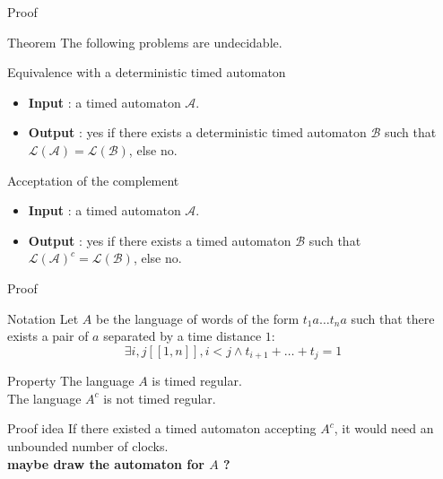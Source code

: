 \begin{frame}{Proof}

  \begin{block}{Theorem}
    The following problems are undecidable.
  \end{block}

  \begin{alertblock}{Equivalence with a deterministic timed automaton}
    \begin{itemize}
	\item \textbf{Input} : a timed automaton $\mathcal{A}$.
	\item \textbf{Output} : yes if there exists a deterministic timed automaton $\mathcal{B}$ such that $\mathcal{L}(\mathcal{A}) = \mathcal{L}(\mathcal{B})$, else no.
    \end{itemize}
  \end{alertblock}
  
    \begin{alertblock}{Acceptation of the complement}
    \begin{itemize}
	\item \textbf{Input} : a timed automaton $\mathcal{A}$.
	\item \textbf{Output} : yes if there exists a timed automaton $\mathcal{B}$ such that $\mathcal{L}(\mathcal{A})^c = \mathcal{L}(\mathcal{B})$, else no.
    \end{itemize}
  \end{alertblock}

\end{frame}


\begin{frame}{Proof}

   \begin{block}{Notation}
    Let $A$ be the language of words of the form $t_1 a \dots t_n a$ such that there exists a pair of $a$ separated by a time distance $1$:
$$\exists i,j [\![1,n]\!], i < j  \land  t_{i+1} + \dots + t_j = 1$$
  \end{block}

  \begin{block}{Property}
    The language $A$ is timed regular.\\
    The language $A^c$ is not timed regular.
  \end{block}

  \begin{block}{Proof idea}
    If there existed a timed automaton accepting $A^c$, it would need an unbounded number of clocks.\\
    \textbf{maybe draw the automaton for $A$ ?}
  \end{block}

\end{frame}


